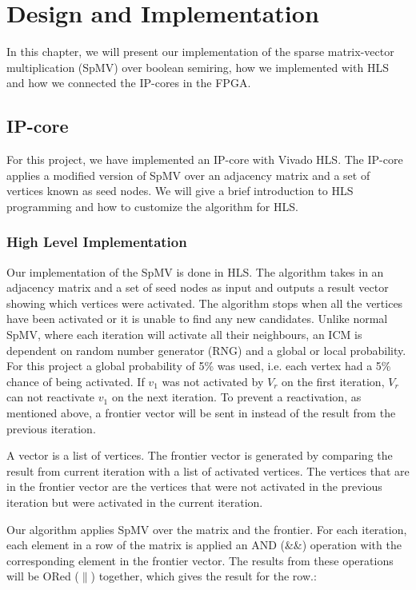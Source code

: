 \chapter{Design and Implementation} \label{methode}
In this chapter, we will present our implementation of the sparse matrix-vector multiplication (SpMV) over boolean semiring, how we implemented with HLS and how we connected the IP-cores in the FPGA.

\section{IP-core}
For this project, we have implemented an IP-core with Vivado HLS. The IP-core applies a modified version of SpMV over an adjacency matrix and a set of vertices known as seed nodes. We will give a brief introduction to HLS programming and how to customize the algorithm for HLS.

\subsection{High Level Implementation}
Our implementation of the SpMV is done in HLS. The algorithm takes in an adjacency matrix and a set of seed nodes as input and outputs a result vector showing which vertices were activated. The algorithm stops when all the vertices have been activated or it is unable to find any new candidates. Unlike normal SpMV, where each iteration will activate all their neighbours, an ICM is dependent on random number generator (RNG) and a global or local probability. For this project a global probability of 5\% was used, i.e. each vertex had a 5\% chance of being activated. If $v_1$ was not activated by $V_r$ on the first iteration, $V_r$ can not reactivate $v_1$ on the next iteration. To prevent a reactivation, as mentioned above, a frontier vector will be sent in instead of the result from the previous iteration. 

A vector is a list of vertices. The frontier vector is generated by comparing the result from current iteration with a list of activated vertices. The vertices that are in the frontier vector are the vertices that were not activated in the previous iteration but were activated in the current iteration. 

Our algorithm applies SpMV over the matrix and the frontier. For each iteration, each element in a row of the matrix is applied an AND (\&\&) operation with the corresponding element in the frontier vector. The results from these operations will be ORed ($\|$) together, which gives the result for the row.:
\begin{algorithm}
\begin{algorithmic}[2]
\end{algorithmic}
\end{algorithm}


